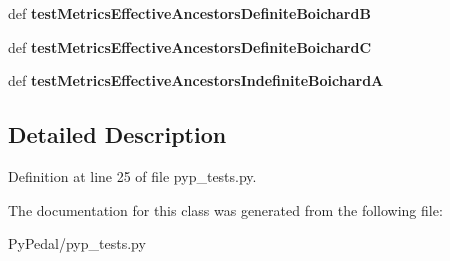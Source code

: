 \begin{DoxyCompactItemize}
\item 
\hypertarget{classPyPedal_1_1pyp__tests_1_1PyPedalMetricsTestCases_ac4c410abcc3af2febd622e9c138b1d44}{
def {\bfseries testMetricsEffectiveAncestorsDefiniteBoichardB}}
\label{classPyPedal_1_1pyp__tests_1_1PyPedalMetricsTestCases_ac4c410abcc3af2febd622e9c138b1d44}

\item 
\hypertarget{classPyPedal_1_1pyp__tests_1_1PyPedalMetricsTestCases_a4fee53e56f35688e997b9e5e982fdcd9}{
def {\bfseries testMetricsEffectiveAncestorsDefiniteBoichardC}}
\label{classPyPedal_1_1pyp__tests_1_1PyPedalMetricsTestCases_a4fee53e56f35688e997b9e5e982fdcd9}

\item 
\hypertarget{classPyPedal_1_1pyp__tests_1_1PyPedalMetricsTestCases_a212eff631af7236d57ca8b283fa6a654}{
def {\bfseries testMetricsEffectiveAncestorsIndefiniteBoichardA}}
\label{classPyPedal_1_1pyp__tests_1_1PyPedalMetricsTestCases_a212eff631af7236d57ca8b283fa6a654}

\end{DoxyCompactItemize}


\subsection{Detailed Description}


Definition at line 25 of file pyp\_\-tests.py.



The documentation for this class was generated from the following file:\begin{DoxyCompactItemize}
\item 
PyPedal/pyp\_\-tests.py\end{DoxyCompactItemize}
